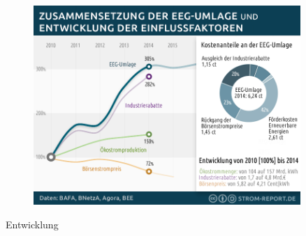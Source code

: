 \documentclass[aspectratio=1610, professionalfonts, 9pt]{beamer}
\begin{document}
{
\begin{frame}
  \begin{figure}
  \includegraphics[width=0.9\textwidth]{images/eeg-umlage.png}
  \end{figure}
\end{frame}
}


\begin{frame}{Entwicklung}

\end{frame}
\end{document}
